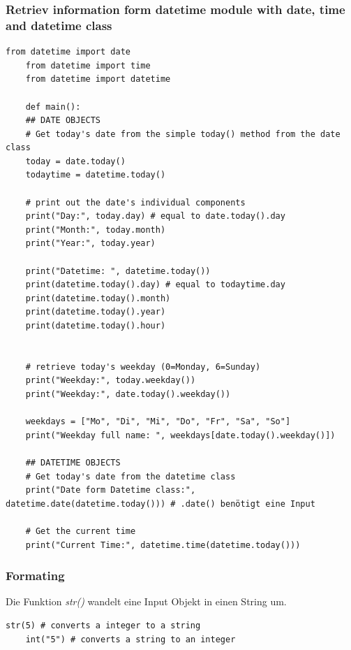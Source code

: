 \subsubsection{Retriev information form datetime module with date, time and datetime class}
\begin{lstlisting}[style=python]
	from datetime import date
	from datetime import time
	from datetime import datetime
	
	def main():
	## DATE OBJECTS
	# Get today's date from the simple today() method from the date class
	today = date.today()
	todaytime = datetime.today()
	
	# print out the date's individual components
	print("Day:", today.day) # equal to date.today().day
	print("Month:", today.month) 
	print("Year:", today.year)
	
	print("Datetime: ", datetime.today())
	print(datetime.today().day) # equal to todaytime.day
	print(datetime.today().month)
	print(datetime.today().year)
	print(datetime.today().hour)
	
	
	# retrieve today's weekday (0=Monday, 6=Sunday)
	print("Weekday:", today.weekday())
	print("Weekday:", date.today().weekday())
	
	weekdays = ["Mo", "Di", "Mi", "Do", "Fr", "Sa", "So"]
	print("Weekday full name: ", weekdays[date.today().weekday()])
	
	## DATETIME OBJECTS
	# Get today's date from the datetime class
	print("Date form Datetime class:", datetime.date(datetime.today())) # .date() benötigt eine Input
	
	# Get the current time
	print("Current Time:", datetime.time(datetime.today()))
\end{lstlisting}

\subsubsection{Formating}
Die Funktion \textit{str()} wandelt eine Input Objekt in einen String um. 
\begin{lstlisting}[style=python]
	str(5) # converts a integer to a string
	int("5") # converts a string to an integer
\end{lstlisting}

